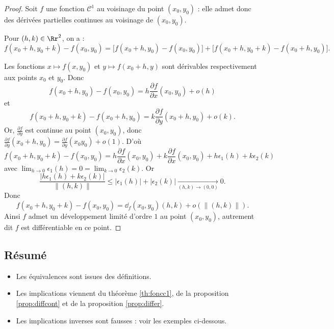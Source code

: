 \documentclass[12pt, class=report,crop=false]{standalone}
\begin{document}
{\begin{exemple}
\end{exemple}



\begin{proof}
Soit $f$ une fonction $\mathcal{C}^1$ au voisinage du point $(x_0,y_0)$ : elle admet donc des dérivées partielles continues au voisinage de $(x_0,y_0)$. 


Pour $(h,k)\in \Rr^2$, on a :
$$f(x_0+h,y_0+k)-f(x_0,y_0)=\big[f(x_0+h,y_0)-f(x_0,y_0)\big]
+\big[f(x_0+h,y_0+k)-f(x_0+h,y_0)\big].$$

Les fonctions $x\mapsto f(x,y_0)$ et $y\mapsto f(x_0+h,y)$ sont dérivables respectivement aux points $x_0$ et $y_0$. Donc
$$f(x_0+h,y_0)-f(x_0,y_0)=h\frac{\partial f}{\partial x}(x_0,y_0)+o(h)$$
et
$$f(x_0+h,y_0+k)-f(x_0+h,y_0)=k\frac{\partial f}{\partial y}(x_0+h,y_0)+o(k).$$
Or, $\frac{\partial f}{\partial y}$ est continue au point $(x_0,y_0)$, donc $\frac{\partial f}{\partial y}(x_0+h,y_0)=\frac{\partial f}{\partial y}(x_0y_0)+o(1)$. D'où
$$f(x_0+h,y_0+k)-f(x_0,y_0)=h\frac{\partial f}{\partial x}(x_0,y_0)+k\frac{\partial f}{\partial x}(x_0,y_0)+h\epsilon _1(h)+k\epsilon _2(k)$$
avec $\lim _{h\to 0}\epsilon _1(h)=0=\lim _{k\to 0}\epsilon _2(k)$. Or
$$\frac{|h\epsilon _1(h)+k\epsilon _2(k)|}{\|(h,k)\|}\le |\epsilon _1(h)|+|\epsilon _2(k)| \underset{(h,k)\to(0,0)}{\longrightarrow} 0.$$
Donc
$$f(x_0+h,y_0+k)-f(x_0,y_0)=\dd_f (x_0,y_0)(h,k)+o\left(\|(h,k)\|\right).$$
Ainsi $f$ admet un développement limité d'ordre $1$ au point $(x_0,y_0)$, autrement dit $f$ est différentiable en ce point.
\end{proof}



\subsection{Résumé}
 


\begin{itemize}
  \item Les équivalences sont issues des définitions.
  \item Les implications viennent du théorème \ref{th:foncc1}, de la proposition \ref{prop:diffcont} et de la proposition \ref{prop:differ}.
  \item Les implications inverses sont fausses : voir les exemples ci-dessous.
\end{itemize}
    
}
\end{document}
